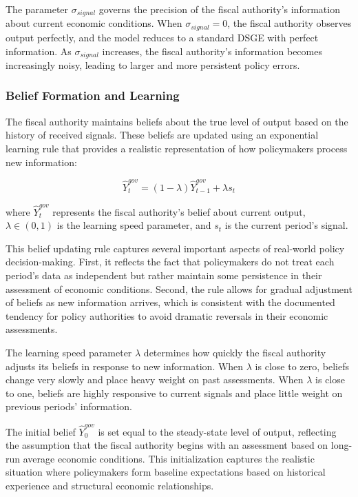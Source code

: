 \documentclass[5p,authoryear]{elsarticle}
\begin{document}
The parameter $\sigma_{signal}$ governs the precision of the fiscal authority's information about current economic conditions. When $\sigma_{signal} = 0$, the fiscal authority observes output perfectly, and the model reduces to a standard DSGE with perfect information. As $\sigma_{signal}$ increases, the fiscal authority's information becomes increasingly noisy, leading to larger and more persistent policy errors.

\subsubsection{Belief Formation and Learning}

The fiscal authority maintains beliefs about the true level of output based on the history of received signals. These beliefs are updated using an exponential learning rule that provides a realistic representation of how policymakers process new information:

\begin{equation}
\hat{Y}_t^{gov} = (1-\lambda) \hat{Y}_{t-1}^{gov} + \lambda s_t
\label{eq:belief_updating}
\end{equation}

where $\hat{Y}_t^{gov}$ represents the fiscal authority's belief about current output, $\lambda \in (0,1)$ is the learning speed parameter, and $s_t$ is the current period's signal.

This belief updating rule captures several important aspects of real-world policy decision-making. First, it reflects the fact that policymakers do not treat each period's data as independent but rather maintain some persistence in their assessment of economic conditions. Second, the rule allows for gradual adjustment of beliefs as new information arrives, which is consistent with the documented tendency for policy authorities to avoid dramatic reversals in their economic assessments.

The learning speed parameter $\lambda$ determines how quickly the fiscal authority adjusts its beliefs in response to new information. When $\lambda$ is close to zero, beliefs change very slowly and place heavy weight on past assessments. When $\lambda$ is close to one, beliefs are highly responsive to current signals and place little weight on previous periods' information.

The initial belief $\hat{Y}_0^{gov}$ is set equal to the steady-state level of output, reflecting the assumption that the fiscal authority begins with an assessment based on long-run average economic conditions. This initialization captures the realistic situation where policymakers form baseline expectations based on historical experience and structural economic relationships.
\end{document}
